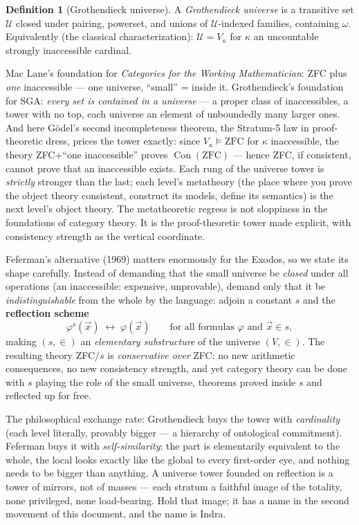 \documentclass[11pt]{article}
\theoremstyle{plain}
\theoremstyle{definition}
\newtheorem{definition}[theorem]{Definition}
\theoremstyle{remark}
\newcommand{\Con}{\operatorname{Con}}
\newcommand{\U}{\mathcal{U}}
\begin{document}
\begin{definition}[Grothendieck universe]
A \emph{Grothendieck universe} is a transitive set $\U$ closed under pairing, powerset, and unions of $\U$-indexed families, containing $\omega$. Equivalently (the classical characterization): $\U = V_\kappa$ for $\kappa$ an uncountable strongly inaccessible cardinal.
\end{definition}

Mac Lane's foundation for \emph{Categories for the Working Mathematician}: ZFC plus \emph{one} inaccessible --- one universe, ``small'' = inside it. Grothendieck's foundation for SGA: \emph{every set is contained in a universe} --- a proper class of inaccessibles, a tower with no top, each universe an element of unboundedly many larger ones. And here G\"odel's second incompleteness theorem, the Stratum-5 law in proof-theoretic dress, prices the tower exactly: since $V_\kappa \models \mathrm{ZFC}$ for $\kappa$ inaccessible, the theory ZFC+``one inaccessible'' proves $\Con(\mathrm{ZFC})$ --- hence ZFC, if consistent, cannot prove that an inaccessible exists. Each rung of the universe tower is \emph{strictly} stronger than the last; each level's metatheory (the place where you prove the object theory consistent, construct its models, define its semantics) is the next level's object theory. The metatheoretic regress is not sloppiness in the foundations of category theory. It is the proof-theoretic tower made explicit, with consistency strength as the vertical coordinate.

Feferman's alternative (1969) matters enormously for the Exodos, so we state its shape carefully. Instead of demanding that the small universe be \emph{closed} under all operations (an inaccessible: expensive, unprovable), demand only that it be \emph{indistinguishable} from the whole by the language: adjoin a constant $s$ and the \textbf{reflection scheme}
\[
\varphi^{s}(\vec{x}) \;\leftrightarrow\; \varphi(\vec{x}) \qquad \text{for all formulas } \varphi \text{ and } \vec{x} \in s,
\]
making $(s, \in)$ an \emph{elementary substructure} of the universe $(V, \in)$. The resulting theory ZFC/$s$ is \emph{conservative over} ZFC: no new arithmetic consequences, no new consistency strength, and yet category theory can be done with $s$ playing the role of the small universe, theorems proved inside $s$ and reflected up for free.

The philosophical exchange rate: Grothendieck buys the tower with \emph{cardinality} (each level literally, provably bigger --- a hierarchy of ontological commitment). Feferman buys it with \emph{self-similarity}: the part is elementarily equivalent to the whole, the local looks exactly like the global to every first-order eye, and nothing needs to be bigger than anything. A universe tower founded on reflection is a tower of mirrors, not of masses --- each stratum a faithful image of the totality, none privileged, none load-bearing. Hold that image; it has a name in the second movement of this document, and the name is Indra.
\end{document}
